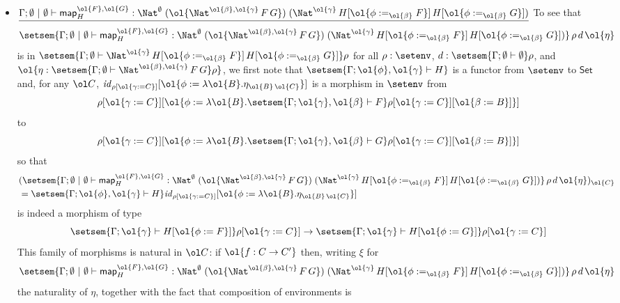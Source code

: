 \documentclass{lmcs}
\theoremstyle{plain}\newtheorem{satz}[thm]{Satz}
\newcommand{\set}{\mathsf{Set}}
\renewcommand{\id}{\mathit{id}}
\newcommand{\map}{\mathsf{map}}
\begin{document}
\begin{itemize}
\item 
  $\underline{\Gamma;\emptyset~|~\emptyset \vdash
  \map^{\ol{F},\ol{G}}_H :
  \Nat^\emptyset\;(\ol{\Nat^{\ol{\beta},\ol{\gamma}}\,F\,G})\;
  (\Nat^{\ol{\gamma}}\,H[\ol{\phi :=_{\ol{\beta}} F}]\,H[\ol{\phi
      :=_{\ol{\beta}} G}])}$\;
To see that
\[
\setsem{\Gamma; \emptyset~|~\emptyset \vdash \map^{\ol{F},\ol{G}}_H
    : \Nat^\emptyset\;(\ol{\Nat^{\ol{\beta},\ol{\gamma}}\,F\,G})\;
    (\Nat^{\ol{\gamma}}\,H[\ol{\phi :=_{\ol{\beta}} F}]\,H[\ol{\phi
        :=_{\ol{\beta}} G}])}\,\rho\,d\, \ol{\eta}
\]
is in $\setsem{\Gamma; \emptyset \vdash
    \Nat^{\ol{\gamma}}\,H[\ol{\phi :=_{\ol{\beta}} F}]\,H[\ol{\phi
        :=_{\ol{\beta}} G}]} \rho$
for all $\rho : \setenv$, $d : \setsem{\Gamma;\emptyset \vdash \emptyset} \rho$,
and $\ol{\eta : \setsem{\Gamma; \emptyset
  \vdash\Nat^{\ol{\beta},\ol{\gamma}}\,F\,G} \rho}$,
  we first note that
$\setsem{\Gamma ;\ol{\phi}, \ol{\gamma} \vdash H}$ is a functor from
  $\setenv$ to $\set$ and, for any $\ol C$, $\id_{\rho[\ol{\gamma :=
        C}]}[\ol{\phi := \lambda \ol{B}. \eta_{\ol{B}\,\ol{C}}}]$ is a
  morphism in $\setenv$ from \[\rho[\ol{\gamma := C}][\ol{\phi :=
      \lambda \ol{B}.\setsem{\Gamma; \ol{\gamma},\ol{\beta} \vdash
        F}\rho[\ol{\gamma := C}][\ol{\beta := B}]}]\] to
\[\rho[\ol{\gamma := C}][\ol{\phi := \lambda \ol{B}.\setsem{\Gamma;
\ol{\gamma},\ol{\beta} \vdash G}\rho[\ol{\gamma := C}][\ol{\beta := B}]}]\]
so that
\begin{align*}
&(\setsem{\Gamma; \emptyset~|~\emptyset \vdash
  \map^{\ol{F},\ol{G}}_H :
\Nat^\emptyset\;(\ol{\Nat^{\ol{\beta},\ol{\gamma}}\,F\,G})\;
(\Nat^{\ol{\gamma}}\,H[\ol{\phi :=_{\ol{\beta}} F}]\,H[\ol{\phi
    :=_{\ol{\beta}} G}])}\,\rho\,d\, \ol{\eta})_{\ol{C}} \\
  &=  \setsem{\Gamma; \ol{\phi},\ol{\gamma} \vdash H}\id_{\rho[\ol{\gamma
      := C}]}[\ol{\phi := \lambda \ol{B}. \eta_{\ol{B}\,\ol{C}}}]
\end{align*}
is indeed a morphism of type
$$\setsem{\Gamma ;\ol{\gamma} \vdash H[\ol{\phi := F}]}\rho[\ol{\gamma
      := C}]%
\to 
\setsem{\Gamma ;\ol{\gamma} \vdash H[\ol{\phi := G}]}\rho[\ol{\gamma
      := C}]$$
This family of morphisms is natural in $\ol C$: if $\ol{f : C \to C'}$
then, writing $\xi$ for
\[
\setsem{\Gamma; \emptyset~|~\emptyset \vdash \map^{\ol{F},\ol{G}}_H
    : \Nat^\emptyset\;(\ol{\Nat^{\ol{\beta},\ol{\gamma}}\,F\,G})\;
    (\Nat^{\ol{\gamma}}\,H[\ol{\phi :=_{\ol{\beta}} F}]\,H[\ol{\phi
        :=_{\ol{\beta}} G}])}\,\rho\,d\, \ol{\eta}
\]
the naturality of $\eta$,
together with the fact that composition of environments is

\end{itemize}
\end{document}
